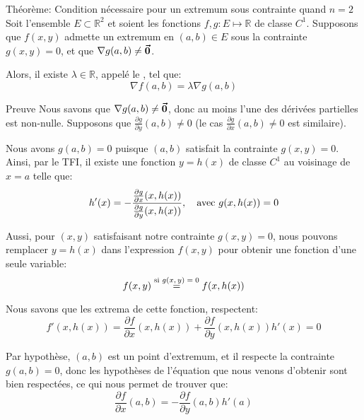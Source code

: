 \documentclass[a4paper]{article}
\begin{document}
\begin{parag}{Théorème: Condition nécessaire pour un extremum sous contrainte quand $n=2$}
    Soit l'ensemble $E \subset \mathbb{R}^2$ et soient les fonctions $f, g : E \mapsto \mathbb{R}$ de classe $C^1$. Supposons que $f\left(x, y\right)$ admette un extremum en $\left(a, b\right) \in E$ sous la contrainte $g\left(x, y\right) = 0$, et que $\nabla g\left(a, b\right) \neq \bvec{0}$.

    Alors, il existe $\lambda \in \mathbb{R}$, appelé le , tel que: 
    \[\nabla f\left(a, b\right) = \lambda \nabla g\left(a, b\right)\]
    
    \demonstrationaconnaitre

    \begin{subparag}{Preuve}
        Nous savons que $\nabla g\left(a, b\right) \neq \bvec{0}$,  donc au moins l'une des dérivées partielles est non-nulle. Supposons que $\frac{\partial g}{\partial y}\left(a, b\right) \neq 0$ (le cas $\frac{\partial g}{\partial x}\left(a, b\right) \neq 0$ est similaire).

        Nous avons $g\left(a, b\right) = 0$ puisque $\left(a, b\right)$ satisfait la contrainte $g\left(x, y\right) = 0$. Ainsi, par le TFI, il existe une fonction $y = h\left(x\right)$ de classe $C^1$ au voisinage de $x = a$ telle que: 
        \[h'\left(x\right) = - \frac{\frac{\partial g}{\partial x}\left(x, h\left(x\right)\right)}{\frac{\partial g}{\partial y}\left(x, h\left(x\right)\right)}, \mathspace \text{avec } g\left(x, h\left(x\right)\right) = 0\]
        
        Aussi, pour $\left(x, y\right)$ satisfaisant notre contrainte $g\left(x, y\right) = 0$, nous pouvons remplacer $y = h\left(x\right)$ dans l'expression $f\left(x, y\right)$ pour obtenir une fonction d'une seule variable: 
        \[f\left(x, y\right) \over{=}{si $g(x, y) = 0$}  f\left(x, h\left(x\right)\right)\]
        
        Nous savons que les extrema de cette fonction, respectent:
        \[f'\left(x, h\left(x\right)\right) = \frac{\partial f}{\partial x}\left(x, h\left(x\right)\right) + \frac{\partial f}{\partial y}\left(x, h\left(x\right)\right)h'\left(x\right) = 0\]
        
        Par hypothèse, $\left(a, b\right)$ est un point d'extremum, et il respecte la contrainte $g\left(a, b\right) = 0$, donc les hypothèses de l'équation que nous venons d'obtenir sont bien respectées, ce qui nous permet de trouver que:
        \[\frac{\partial f}{\partial x}\left(a, b\right) = -\frac{\partial f}{\partial y}\left(a, b\right) h'\left(a\right)\]


\end{subparag}
\end{parag}
\end{document}
